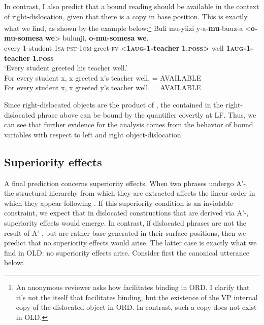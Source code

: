 \documentclass[output=paper,newtxmath,modfonts,nonflat,hidelinks]{langsci/langscibook}
\begin{document}
In contrast, I also predict that a bound reading should be available in the context of right-dislocation, given that there is a copy in base position. This is exactly what we find, as shown by the example below:\footnote{An anonymous reviewer asks how  facilitates binding in ORD. I clarify that it’s not the  itself that facilitates binding, but the existence of the VP internal copy of the dislocated object in ORD. In contrast, such a copy does not exist in OLD.}
\ea\label{ex:ranero:37}
\gll Buli   mu-yiizi  y-a-\textbf{mu}{}-buuz-a <\textbf{o-mu-somesa}    \textbf{we}> bulunji, \textbf{o-mu-somesa}     \textbf{we}.\\
every 1-student \textsc{1sa-pst-1om}{}-greet-\textsc{fv} <\textbf{1\textsc{aug}}\textbf{{}-1-teacher} \textbf{1.\textsc{poss>}} well \textbf{1\textsc{aug}}\textbf{{}-1-teacher} \textbf{1.\textsc{poss}}\\        
\glt ‘Every student greeted his teacher well.’ \\

\-\hspace{1cm}For every student x, x greeted x’s teacher well. = AVAILABLE\\
\-\hspace{1cm}For every student x, x greeted y’s teacher well. = AVAILABLE
\z

Since right-dislocated objects are the product of , the  contained in the right-dislocated phrase above can be bound by the quantifier  covertly at LF. Thus, we can see that further evidence for the analysis comes from the behavior of bound variables with respect to left and right object-dislocation.

\subsection{Superiority effects}\label{sec:ranero:5.3}

{A final prediction concerns superiority effects. When two phrases undergo A’-, the structural hierarchy from which they are extracted affects the linear order in which they appear following . If this superiority condition is an inviolable constraint, we expect that in dislocated constructions that are derived via A’-, superiority effects would emerge. In contrast, if dislocated phrases are not the result of A’-, but are rather base generated in their surface positions, then we predict that no superiority effects would arise. The latter case is exactly what we find in  OLD: no superiority effects arise. Consider first the canonical utterance below:}
\end{document}
